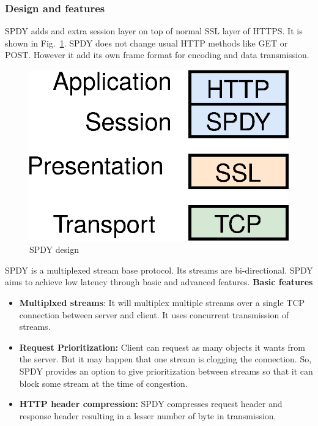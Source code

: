 \subsubsection{Design and features}
SPDY adds and extra session layer on top of normal SSL layer of HTTPS. It is shown in Fig.~\ref{fig:spdy.design}. SPDY does not change usual HTTP methods like GET or POST. However it add its own frame format for encoding and data transmission. 
\begin{figure}[h]
    \centering
    \includegraphics[width=\linewidth]{img/spdy/spdy_design}
    \caption{SPDY design}
    \label{fig:spdy.design}
\end{figure}

SPDY is a multiplexed stream base protocol. Its streams are bi-directional. SPDY aims to achieve low latency through basic and advanced features.
\textbf{Basic features}
\begin{itemize}
    \item \textbf{Multiplxed streams}: It will multiplex multiple streams over a single TCP connection between server and client. It uses concurrent transmission of streams.
    \item \textbf{Request Prioritization:} Client can request as many objects it wants from the server. But it may happen that one stream is clogging the connection. So, SPDY provides an option to give prioritization between streams so that it can block some stream at the time of congestion.
    \item \textbf{HTTP header compression:} SPDY compresses request header and response header resulting in a lesser number of byte in transmission.
\end{itemize}

